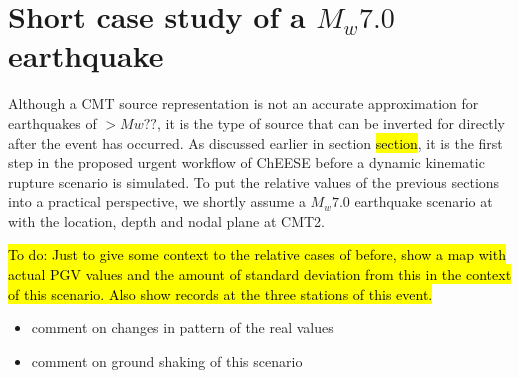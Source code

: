 \documentclass[../Text/00main.tex]{subfiles}
\begin{document}
\FloatBarrier

\section{Short case study of a $M_w 7.0$ earthquake}

Although a CMT source representation is not an accurate approximation for earthquakes of $> Mw ??$, it is the type of source that can be inverted for directly after the event has occurred. As discussed earlier in section \hl{section}, it is the first step in the proposed urgent workflow of ChEESE  before a dynamic kinematic rupture scenario is simulated. To put the relative values of the previous sections into a practical perspective, we shortly assume a $M_w 7.0$ earthquake scenario at with the location, depth and nodal plane at CMT2. 

\hl{To do: Just to give some context to the relative cases of before, show a map with actual PGV values and the amount of standard deviation from this in the context of this scenario. Also show records at the three stations of this event.}






\begin{itemize}
    \item comment on changes in pattern of the real values 
    \item comment on ground shaking of this scenario
\end{itemize}
\end{document}
